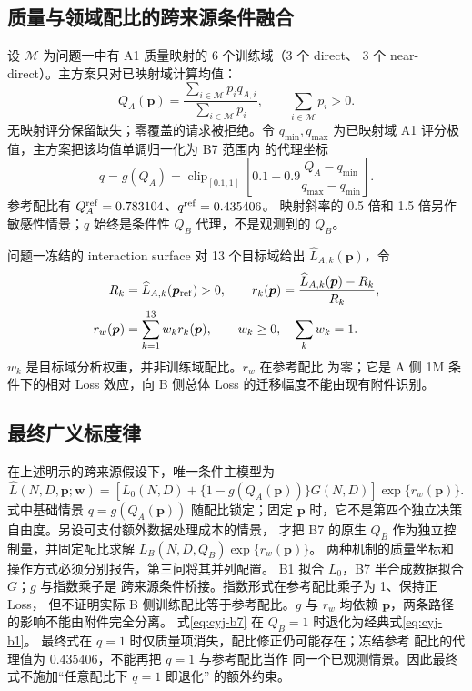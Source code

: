 \subsection{质量与领域配比的跨来源条件融合}

设 $\mathcal M$ 为问题一中有 A1 质量映射的 6 个训练域（3 个 direct、
3 个 near-direct）。主方案只对已映射域计算均值：
\begin{equation}\label{eq:cyj-qa}
Q_A(\boldsymbol p)=\frac{\sum_{i\in\mathcal M}p_iq_{A,i}}
{\sum_{i\in\mathcal M}p_i},\qquad \sum_{i\in\mathcal M}p_i>0.
\end{equation}
无映射评分保留缺失；零覆盖的请求被拒绝。令 $q_{\min},q_{\max}$
为已映射域 A1 评分极值，主方案把该均值单调归一化为 B7 范围内
的代理坐标
\begin{equation}\label{eq:cyj-qproxy}
q=g(Q_A)=\operatorname{clip}_{[0.1,1]}
\left[0.1+0.9\frac{Q_A-q_{\min}}{q_{\max}-q_{\min}}\right].
\end{equation}
参考配比有 $Q_A^{\rm ref}=0.783104$、$q^{\rm ref}=0.435406$。
映射斜率的 0.5 倍和 1.5 倍另作敏感性情景；$q$ 始终是条件性
$Q_B$ 代理，不是观测到的 $Q_B$。

问题一冻结的 interaction surface 对 13 个目标域给出
$\widehat L_{A,k}(\boldsymbol p)$，令
\begin{align}\label{eq:cyj-rp}
R_k&=\widehat L_{A,k}(\boldsymbol p_{\rm ref})>0,\qquad
r_k(\boldsymbol p)=\frac{\widehat L_{A,k}(\boldsymbol p)-R_k}{R_k},\\
r_w(\boldsymbol p)&=\sum_{k=1}^{13}w_kr_k(\boldsymbol p),\qquad
w_k\geq0,\quad\sum_kw_k=1.
\end{align}
$w_k$ 是目标域分析权重，并非训练域配比。$r_w$ 在参考配比
为零；它是 A 侧 1M 条件下的相对 Loss 效应，向 B 侧总体 Loss
的迁移幅度不能由现有附件识别。

\subsection{最终广义标度律}

在上述明示的跨来源假设下，唯一条件主模型为
\begin{equation}\label{eq:cyj-v8}
\boxed{\widehat L(N,D,\boldsymbol p;\boldsymbol w)=
\left[L_0(N,D)+\{1-g(Q_A(\boldsymbol p))\}G(N,D)\right]
\exp\{r_w(\boldsymbol p)\}.}
\end{equation}
式中基础情景 $q=g(Q_A(\boldsymbol p))$ 随配比锁定；固定 $\boldsymbol p$
时，它不是第四个独立决策自由度。另设可支付额外数据处理成本的情景，
才把 B7 的原生 $Q_B$ 作为独立控制量，并固定配比求解
$L_B(N,D,Q_B)\exp\{r_w(\boldsymbol p)\}$。
两种机制的质量坐标和操作方式必须分别报告，第三问将其并列配置。
B1 拟合 $L_0$，B7 半合成数据拟合 $G$；$g$ 与指数乘子是
跨来源条件桥接。指数形式在参考配比乘子为 1、保持正 Loss，
但不证明实际 B 侧训练配比等于参考配比。$g$ 与 $r_w$ 均依赖
$\boldsymbol p$，两条路径的影响不能由附件完全分离。
式\eqref{eq:cyj-b7} 在 $Q_B=1$ 时退化为经典式\eqref{eq:cyj-b1}。
最终式在 $q=1$ 时仅质量项消失，配比修正仍可能存在；冻结参考
配比的代理值为 $0.435406$，不能再把 $q=1$ 与参考配比当作
同一个已观测情景。因此最终式不施加“任意配比下 $q=1$ 即退化”
的额外约束。

